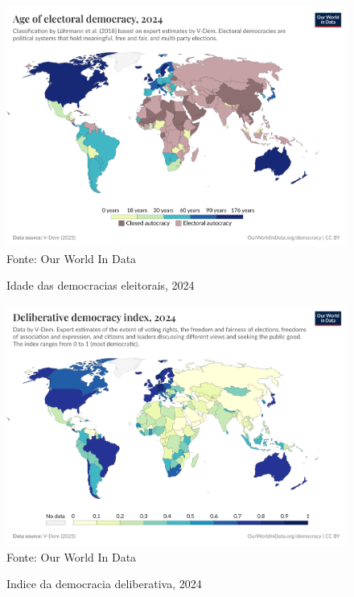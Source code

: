 \begin{figure}[ht]
    \centering
    \caption{Idade das democracias eleitorais, 2024}
    \includegraphics[width=1\linewidth]{figuras/democracia/age-of-electoral-democracy.png}
    \label{fig:age-of-electoral-democracy}
    \footnotesize{Fonte: Our World In Data}
\end{figure}


\begin{figure}[ht]
    \centering
    \caption{Indice da democracia deliberativa, 2024}
    \includegraphics[width=1\linewidth]{figuras/democracia/deliberative-democracy-index-vdem.png}
    \label{fig:deliberative-democracy-index-vdem}
    \footnotesize{Fonte: Our World In Data}
\end{figure}


